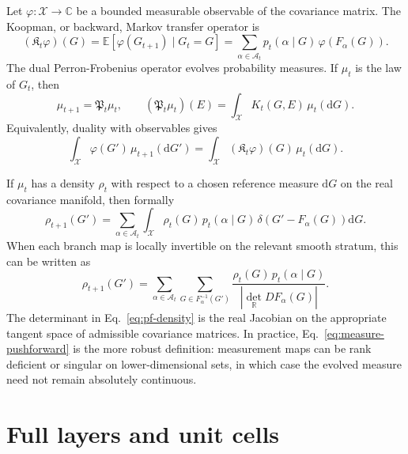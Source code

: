 \documentclass[aps,preprint,onecolumn,nofootinbib,superscriptaddress]{revtex4-2}
\newcommand{\E}{\mathbb{E}}
\newcommand{\dd}{\mathrm{d}}
\newcommand{\cA}{\mathcal{A}}
\newcommand{\cX}{\mathcal{X}}
\newcommand{\PF}{\mathfrak{P}}
\newcommand{\Koop}{\mathfrak{K}}
\theoremstyle{definition}
\theoremstyle{plain}
\begin{document}
Let \(\varphi:\cX\to\mathbb{C}\) be a bounded measurable observable of the
covariance matrix. The Koopman, or backward, Markov transfer operator is
\begin{equation}
  (\Koop_t\varphi)(G)
  =
  \E\!\left[\varphi(G_{t+1})\mid G_t=G\right]
  =
  \sum_{\alpha\in\cA_t}
  p_t(\alpha\mid G)\,
  \varphi\!\left(F_\alpha(G)\right).
  \label{eq:koopman}
\end{equation}
The dual Perron-Frobenius operator evolves probability measures. If \(\mu_t\)
is the law of \(G_t\), then
\begin{equation}
  \mu_{t+1}=\PF_t\mu_t,
  \qquad
  (\PF_t\mu_t)(E)
  =
  \int_\cX K_t(G,E)\,\mu_t(\dd G).
  \label{eq:measure-pushforward}
\end{equation}
Equivalently, duality with observables gives
\begin{equation}
  \int_\cX \varphi(G')\,\mu_{t+1}(\dd G')
  =
  \int_\cX (\Koop_t\varphi)(G)\,\mu_t(\dd G).
  \label{eq:duality}
\end{equation}

If \(\mu_t\) has a density \(\rho_t\) with respect to a chosen reference measure
\(\dd G\) on the real covariance manifold, then formally
\begin{equation}
  \rho_{t+1}(G')
  =
  \sum_{\alpha\in\cA_t}
  \int_\cX
  \rho_t(G)\,
  p_t(\alpha\mid G)\,
  \delta\!\left(G'-F_\alpha(G)\right)
  \dd G.
  \label{eq:density-delta}
\end{equation}
When each branch map is locally invertible on the relevant smooth stratum, this
can be written as
\begin{equation}
  \rho_{t+1}(G')
  =
  \sum_{\alpha\in\cA_t}
  \sum_{G\in F_\alpha^{-1}(G')}
  \frac{\rho_t(G)\,p_t(\alpha\mid G)}
       {|\det_{\mathbb{R}} D F_\alpha(G)|}.
  \label{eq:pf-density}
\end{equation}
The determinant in Eq.~\eqref{eq:pf-density} is the real Jacobian on the
appropriate tangent space of admissible covariance matrices. In practice,
Eq.~\eqref{eq:measure-pushforward} is the more robust definition: measurement
maps can be rank deficient or singular on lower-dimensional sets, in which case
the evolved measure need not remain absolutely continuous.

\section{Full layers and unit cells}
\end{document}
